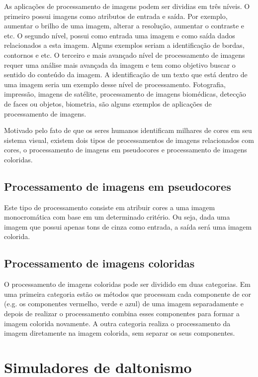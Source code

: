 \documentclass[	12pt, Times, openright, twoside, a4paper, english, brazil]{abntex2}
\begin{document}
As aplicações de processamento de imagens podem ser dividias em três níveis. O primeiro possui imagens como atributos de entrada e saída. Por exemplo, aumentar o brilho de uma imagem, alterar a resolução, aumentar o contraste e etc. O segundo nível, possui como entrada uma imagem e como saída dados relacionados a esta imagem. Alguns exemplos seriam a identificação de bordas, contornos e etc. O terceiro e mais avançado nível de processamento de imagens requer uma análise mais avançada da imagem e tem como objetivo buscar o sentido do conteúdo da imagem. A identificação de um texto que está dentro de uma imagem seria um exemplo desse nível de processamento. Fotografia, impressão, imagens de satélite, processamento de imagens biomédicas, detecção de faces ou objetos, biometria, são alguns exemplos de aplicações de processamento de imagens.

Motivado pelo fato de que os seres humanos identificam milhares de cores em seu sistema visual, existem dois tipos de processamentos de imagens relacionados com cores, o processamento de imagens em pseudocores e processamento de imagens coloridas.

\subsection{Processamento de imagens em pseudocores}
Este tipo de processamento consiste em atribuir cores a uma imagem monocromática com base em um determinado critério. Ou seja, dada uma imagem que possui apenas tons de cinza como entrada, a saída será uma imagem colorida.

\subsection{Processamento de imagens coloridas}

O processamento de imagens coloridas pode ser dividido em duas categorias. Em uma primeira categoria estão os métodos que processam cada componente de cor (e.g. os componentes vermelho, verde e azul) de uma imagem separadamente e depois de realizar o processamento combina esses componentes para formar a imagem colorida novamente. A outra categoria realiza o processamento da imagem diretamente na imagem colorida, sem separar os seus componentes.

\section{Simuladores de daltonismo}
\label{sec:simulacao}
\end{document}
